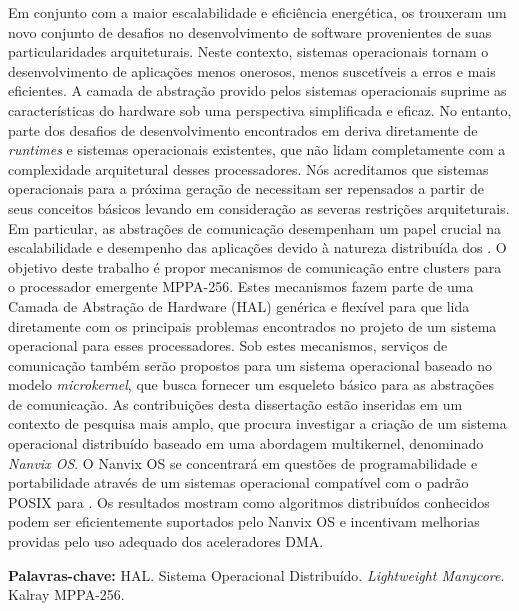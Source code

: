 
\begin{resumo}[Resumo]
	Em conjunto com a maior escalabilidade e eficiência energética, os
	\textit{\lightweight \manycores} trouxeram um novo conjunto de desafios no
	desenvolvimento de software provenientes de suas particularidades
	arquiteturais. Neste contexto, sistemas operacionais tornam o
	desenvolvimento de aplicações menos onerosos, menos suscetíveis a
	erros e mais eficientes. A camada de abstração provido pelos
	sistemas operacionais suprime as características do hardware sob
	uma perspectiva simplificada e eficaz. No entanto, parte dos desafios
	de desenvolvimento encontrados em \textit{\lightweight \manycores} deriva
	diretamente de \textit{runtimes} e sistemas operacionais existentes,
	que não lidam completamente com a complexidade arquitetural desses
	processadores. Nós acreditamos que sistemas operacionais para a
	próxima geração de \textit{\lightweight \manycores} necessitam ser repensados
	a partir de seus conceitos básicos levando em consideração as severas
	restrições arquiteturais. Em particular, as abstrações de comunicação
	desempenham um papel crucial na escalabilidade e desempenho das
	aplicações devido à natureza distribuída dos \textit{\manycores}. O objetivo
	deste trabalho é propor mecanismos de comunicação entre clusters
	para o processador \textit{\manycore} emergente MPPA-256. Estes mecanismos
	fazem parte de uma Camada de Abstração de Hardware (HAL) genérica
	e flexível para \textit{\lightweight \manycores} que lida
	diretamente com os principais problemas encontrados no projeto de um
	sistema operacional para esses processadores. Sob estes mecanismos,
	serviços de comunicação também serão propostos para um sistema
	operacional baseado no modelo \textit{microkernel}, que busca fornecer
	um esqueleto básico para as abstrações de comunicação. As contribuições
	desta dissertação estão inseridas em um contexto de pesquisa mais
	amplo, que procura investigar a criação de um sistema operacional
	distribuído baseado em uma abordagem multikernel, denominado
	\textit{Nanvix OS}. O Nanvix OS se concentrará em questões de
	programabilidade e portabilidade através de um sistemas operacional
	compatível com o padrão POSIX para \textit{\lightweight \manycore}. Os
	resultados mostram como algoritmos distribuídos conhecidos podem
	ser eficientemente suportados pelo Nanvix OS e incentivam melhorias
	providas pelo uso adequado dos aceleradores DMA.

	\vspace{\baselineskip}
	\textbf{Palavras-chave:} HAL. Sistema Operacional Distribuído. \textit{Lightweight Manycore}. Kalray MPPA-256.
\end{resumo}

